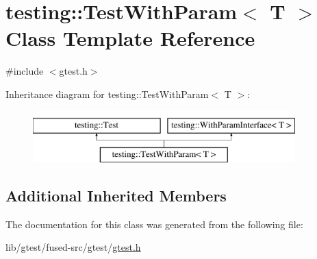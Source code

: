 \hypertarget{classtesting_1_1_test_with_param}{\section{testing\-:\-:Test\-With\-Param$<$ T $>$ Class Template Reference}
\label{classtesting_1_1_test_with_param}
}


{\ttfamily \#include $<$gtest.\-h$>$}

Inheritance diagram for testing\-:\-:Test\-With\-Param$<$ T $>$\-:\begin{figure}[H]
\begin{center}
\leavevmode
\includegraphics[height=2.000000cm]{classtesting_1_1_test_with_param}
\end{center}
\end{figure}
\subsection*{Additional Inherited Members}


The documentation for this class was generated from the following file\-:\begin{DoxyCompactItemize}
\item 
lib/gtest/fused-\/src/gtest/\hyperlink{fused-src_2gtest_2gtest_8h}{gtest.\-h}\end{DoxyCompactItemize}
